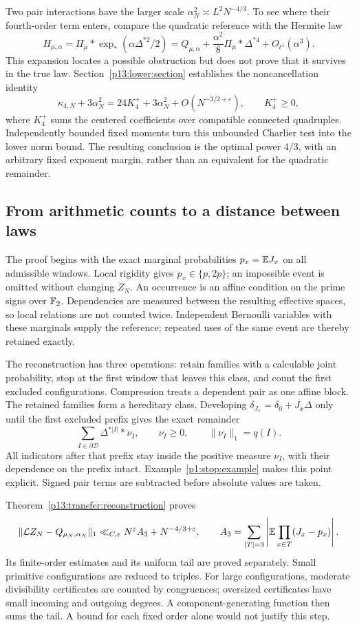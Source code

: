 Two pair interactions have the larger scale
\(\alpha_N^2\asymp L^2N^{-4/3}\). To see where their fourth-order
term enters, compare the quadratic reference with the Hermite law
\[
 H_{\mu,\alpha}=\Pi_\mu*\exp_*(\alpha\Delta^{*2}/2)
  =Q_{\mu,\alpha}
   +\frac{\alpha^2}{8}\Pi_\mu*\Delta^{*4}
   +O_{\ell^1}(\alpha^3).
\]
This expansion locates a possible obstruction but does not prove
that it survives in the true law. Section~\ref{p13:lower:section}
establishes the noncancellation identity
\[
 \kappa_{4,N}+3\alpha_N^2
   =24K_4^++3\alpha_N^2+O(N^{-3/2+\varepsilon}),
 \qquad K_4^+\ge0,
\]
where \(K_4^+\) sums the centered coefficients over compatible
connected quadruples. Independently bounded fixed moments turn this
unbounded Charlier test into the lower norm bound.
The resulting conclusion is the optimal power \(4/3\),
with an arbitrary fixed exponent margin, rather than an
equivalent for the quadratic remainder.

\subsection{From arithmetic counts to a distance between laws}
\label{p1:intro:strategy}

The proof begins with the exact marginal probabilities
\(p_x=\mathbb E J_x\) on all admissible windows. Local rigidity gives
\(p_x\in\{p,2p\}\); an impossible event is omitted without
changing \(Z_N\). An occurrence is an affine condition on the
prime signs over \(\mathbb F_2\). Dependencies are measured between
the resulting effective spaces, so local relations are not
counted twice. Independent Bernoulli variables with these
marginals supply the reference; repeated uses of the same
event are thereby retained exactly.

The reconstruction has three operations: retain families with a
calculable joint probability, stop at the first window that leaves
this class, and count the first excluded configurations.
Compression treats a dependent pair as one affine block.
The retained families form a hereditary class. Developing
\(\delta_{J_x}=\delta_0+J_x\Delta\) only until the first
excluded prefix gives the exact remainder
\[
 \sum_{I\in\partial\mathscr D}\Delta^{*|I|}*\nu_I,
 \qquad \nu_I\ge0,\qquad \|\nu_I\|_1=q(I).
\]
All indicators after that prefix stay inside the positive
measure \(\nu_I\), with their dependence on the prefix intact.
Example~\ref{p1:stop:example} makes this point explicit.
Signed pair terms are subtracted before absolute values are taken.

Theorem~\ref{p13:transfer:reconstruction} proves
\[
 \|\mathcal L Z_N-Q_{\mu_N,\alpha_N}\|_1
 \ll_{C,\varepsilon}N^\varepsilon A_3+N^{-4/3+\varepsilon},
 \qquad
 A_3=\sum_{|T|=3}\left|\mathbb E\prod_{x\in T}(J_x-p_x)\right|.
\]
Its finite-order estimates and its uniform tail are proved
separately. Small primitive configurations are reduced to
triples. For large configurations, moderate divisibility
certificates are counted by congruences; oversized certificates
have small incoming and outgoing degrees. A component-generating
function then sums the tail. A bound for each fixed order alone
would not justify this step.

